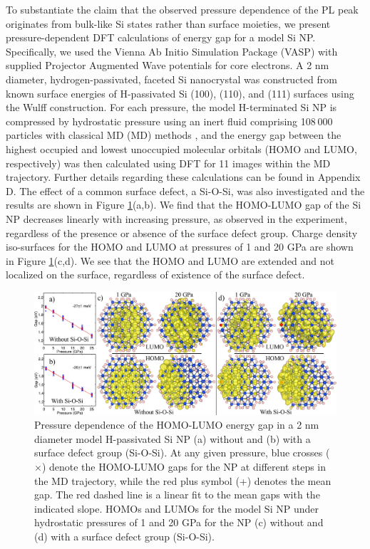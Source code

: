 To substantiate the claim that the observed pressure dependence of the PL peak originates from bulk-like Si states rather than surface moieties, we present pressure-dependent DFT calculations of energy gap for a model Si NP.  Specifically, we used the Vienna Ab Initio Simulation Package (VASP) \cite{PhysRevB.54.11169} with supplied Projector Augmented Wave potentials \cite{kresse1999ultrasoft} for core electrons.  A 2 nm diameter, hydrogen-passivated, faceted Si nanocrystal was constructed from known surface energies of H-passivated Si (100), (110), and (111) surfaces \cite{hong2000equilibrium} using the Wulff construction. For each pressure, the model H-terminated Si NP \cite{PhysRevB.37.6991} is compressed by hydrostatic pressure using an inert fluid comprising 108 000 particles with classical MD (MD) methods \cite{martovnak2002pressure}, and the energy gap between the highest occupied and lowest unoccupied molecular orbitals (HOMO and LUMO, respectively) was then calculated using DFT for 11 images within the MD trajectory. Further details regarding these calculations can be found in Appendix D. The effect of a common surface defect, a Si-O-Si, was also investigated and the results are shown in Figure \ref{f:sipressure5}(a,b). We find that the HOMO-LUMO gap of the Si NP decreases linearly with increasing pressure, as observed in the experiment, regardless of the presence or absence of the surface defect group. Charge density iso-surfaces for the HOMO and LUMO at pressures of 1 and 20 GPa are shown in Figure \ref{f:sipressure5}(c,d). We see that the HOMO and LUMO are extended and not localized on the surface, regardless of existence of the surface defect. \par

\begin{figure}
\begin{center}
\includegraphics[width=\textwidth]{./Chapter6/sipressure5.jpeg}
\caption[Pressure-dependent energy gap of Si NPs derived from density functional theory.]{Pressure dependence of the HOMO-LUMO energy gap in a 2 nm diameter model H-passivated Si NP (a) without and (b) with a surface defect group (Si-O-Si). At any given pressure, blue crosses ($\times$) denote the HOMO-LUMO gaps for the NP at different steps in the MD trajectory, while the red plus symbol (+) denotes the mean gap. The red dashed line is a linear fit to the mean gaps with the indicated slope. HOMOs and LUMOs for the model Si NP under hydrostatic pressures of 1 and 20 GPa for the NP (c) without and (d) with a surface defect group (Si-O-Si).}
\label{f:sipressure5}
\end{center}
\end{figure}

